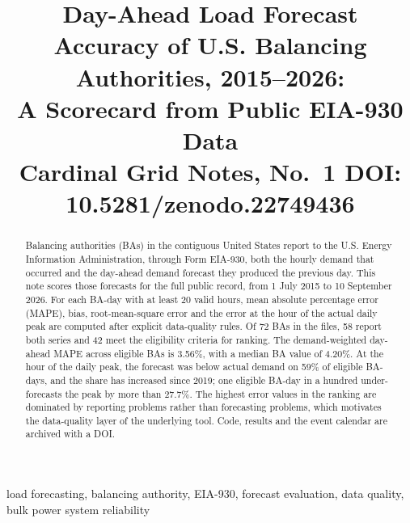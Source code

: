 \documentclass[conference]{IEEEtran}
\begin{document}
\title{Day-Ahead Load Forecast Accuracy of U.S. Balancing Authorities, 2015--2026:\\ A Scorecard from Public EIA-930 Data\\
\large Cardinal Grid Notes, No.\ 1 \quad DOI: 10.5281/zenodo.22749436}

\author{
}

\maketitle

\begin{abstract}
Balancing authorities (BAs) in the contiguous United States report to the U.S. Energy Information Administration, through Form EIA-930, both the hourly demand that occurred and the day-ahead demand forecast they produced the previous day. This note scores those forecasts for the full public record, from 1 July 2015 to 10 September 2026. For each BA-day with at least 20 valid hours, mean absolute percentage error (MAPE), bias, root-mean-square error and the error at the hour of the actual daily peak are computed after explicit data-quality rules. Of 72 BAs in the files, 58 report both series and 42 meet the eligibility criteria for ranking. The demand-weighted day-ahead MAPE across eligible BAs is 3.56\%, with a median BA value of 4.20\%. At the hour of the daily peak, the forecast was below actual demand on 59\% of eligible BA-days, and the share has increased since 2019; one eligible BA-day in a hundred under-forecasts the peak by more than 27.7\%. The highest error values in the ranking are dominated by reporting problems rather than forecasting problems, which motivates the data-quality layer of the underlying tool. Code, results and the event calendar are archived with a DOI.
\end{abstract}

\begin{IEEEkeywords}
load forecasting, balancing authority, EIA-930, forecast evaluation, data quality, bulk power system reliability
\end{IEEEkeywords}
\end{document}
